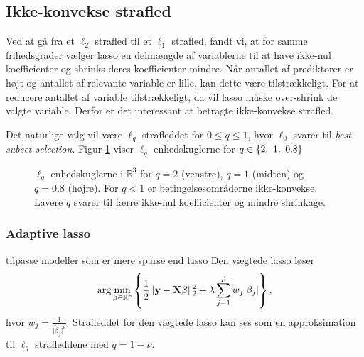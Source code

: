 \subsection{Ikke-konvekse strafled}
Ved at gå fra et \(\ell_2\) strafled til et \(\ell_1\) strafled, fandt vi, at for samme frihedsgrader vælger lasso en delmængde af variablerne til at have ikke-nul koefficienter og shrinks deres koefficienter mindre.
Når antallet af prediktorer er højt og antallet af relevante variable er lille, kan dette være tilstrækkeligt.
For at reducere antallet af variable tilstrækkeligt, da vil lasso måske over-shrink de valgte variable.
Derfor er det interessant at betragte ikke-konvekse strafled.

Det naturlige valg vil være \(\ell_q\) strafleddet for \(0 \leq q \leq 1\), hvor \(\ell_0\) svarer til \textit{best-subset selection}.
Figur \ref{fig:nonconvex_penalties} viser \(\ell_q\) enhedskuglerne for \(q \in \cbr{2, \ 1, \ 0.8}\)

%
\begin{figure}[H]
\centering
\caption{\(\ell_q\) enhedskuglerne i \(\mathbb{R}^3\) for \(q=2\) (venstre), \(q=1\) (midten) og \(q=0.8\) (højre). 
For \(q<1\) er betingelsesområderne ikke-konvekse. Lavere \(q\) svarer til færre ikke-nul koefficienter og mindre shrinkage.}
\label{fig:nonconvex_penalties}
\end{figure}
%

\subsubsection{Adaptive lasso}
\citep{adaptive_lasso}
tilpasse modeller som er mere sparse end lasso
Den vægtede lasso løser
\begin{align*}
\arg \min_{\beta \in \R^p} \cbr{\frac{1}{2} \Vert \y - \X \beta \Vert_2^2 + \lambda \sum_{j=1}^p w_j \vert \beta_j \vert},
\end{align*}
hvor $w_j = \frac{1}{\vert \tilde{\beta}_j \vert^\nu}$.
Strafleddet for den vægtede lasso kan ses som en approksimation til $\ell_q$ strafleddene med $q=1-\nu$.

